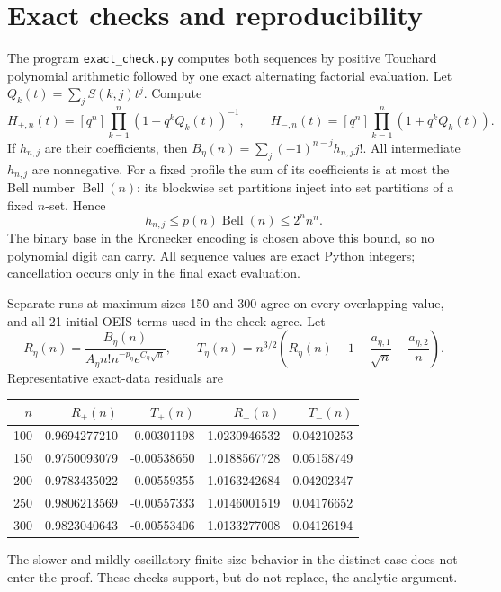 \documentclass[11pt]{article}
\theoremstyle{remark}\newtheorem{remark}[theorem]{Remark}
\newcommand{\coeff}[2]{[#1^{#2}]}
\begin{document}
\section{Exact checks and reproducibility}\label{aop:sec:checks}

The program \texttt{exact\_check.py} computes both sequences by positive
Touchard polynomial arithmetic followed by one exact alternating
factorial evaluation. Let $Q_k(t)=\sum_jS(k,j)t^j$. Compute
\[
 H_{+,n}(t)=\coeff qn\prod_{k=1}^n(1-q^kQ_k(t))^{-1},\qquad
 H_{-,n}(t)=\coeff qn\prod_{k=1}^n(1+q^kQ_k(t)).
\]
If $h_{n,j}$ are their coefficients, then
$B_\eta(n)=\sum_j(-1)^{n-j}h_{n,j}j!$.
All intermediate $h_{n,j}$ are nonnegative. For a fixed profile the
sum of its coefficients is at most the Bell number $\operatorname{Bell}(n)$:
its blockwise set partitions inject into set partitions of a fixed
$n$-set. Hence
\[
 h_{n,j}\le p(n)\operatorname{Bell}(n)\le2^n n^n.
\]
The binary base in the Kronecker encoding is chosen above this bound,
so no polynomial digit can carry. All sequence values are exact Python
integers; cancellation occurs only in the final exact evaluation.

Separate runs at maximum sizes 150 and 300 agree on every overlapping
value, and all 21 initial OEIS terms used in the check agree. Let
\[
 R_\eta(n)=\frac{B_\eta(n)}{A_\eta n!n^{-p_\eta}e^{C_\eta\sqrt n}},\qquad
 T_\eta(n)=n^{3/2}\left(R_\eta(n)-1-\frac{a_{\eta,1}}{\sqrt n}
                                      -\frac{a_{\eta,2}}n\right).
\]
Representative exact-data residuals are
\begin{center}
\begin{tabular}{@{}rrrrr@{}}
\toprule
$n$ & $R_+(n)$ & $T_+(n)$ & $R_-(n)$ & $T_-(n)$\\
\midrule
100 & 0.9694277210 & -0.00301198 & 1.0230946532 & 0.04210253\\
150 & 0.9750093079 & -0.00538650 & 1.0188567728 & 0.05158749\\
200 & 0.9783435022 & -0.00559355 & 1.0163242684 & 0.04202347\\
250 & 0.9806213569 & -0.00557333 & 1.0146001519 & 0.04176652\\
300 & 0.9823040643 & -0.00553406 & 1.0133277008 & 0.04126194\\
\bottomrule
\end{tabular}
\end{center}
The slower and mildly oscillatory finite-size behavior in the distinct
case does not enter the proof. These checks support, but do not replace,
the analytic argument.
\end{document}
